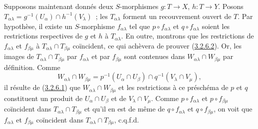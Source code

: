 Supposons maintenant donnés deux $S$-morphismes $g:T\to X$, $h:T\to Y$.
Posons
$T_{\alpha\lambda}=g^{-1}(U_\alpha)\cap h^{-1}(V_\lambda)$~; les
$T_{\alpha\lambda}$ forment un recouvrement ouvert de $T$. Par hypothèse,
il existe un $S$-morphisme $f_{\alpha\lambda}$ tel que
$p\circ f_{\alpha\lambda}$ et $q\circ f_{\alpha\lambda}$ soient les
restrictions respectives de $g$ et $h$ à $T_{\alpha\lambda}$. En outre,
montrons que les restrictions de $f_{\alpha\lambda}$ et
$f_{\beta\mu}$ à
$T_{\alpha\lambda}\cap T_{\beta\mu}$ coïncident, ce qui achèvera de
prouver (\hyperref[I.3.2.6.2-fr]{3.2.6.2}). Or, les images de
$T_{\alpha\lambda}\cap T_{\beta\mu}$ par $f_{\alpha\lambda}$ et par
$f_{\beta\mu}$ sont contenues dans
$W_{\alpha\lambda}\cap W_{\beta\mu}$ par définition. Comme
\[
  W_{\alpha\lambda}\cap W_{\beta\mu}
  =p^{-1}(U_\alpha\cap U_\beta)\cap
   q^{-1}(V_\lambda\cap V_\mu),
\]
il résulte de (\hyperref[I.3.2.6.1-fr]{3.2.6.1}) que
$W_{\alpha\lambda}\cap W_{\beta\mu}$ et les restrictions à ce préschéma
de $p$ et $q$ constituent un produit de
$U_\alpha\cap U_\beta$ et de $V_\lambda\cap V_\mu$. Comme
$p\circ f_{\alpha\lambda}$ et $p\circ f_{\beta\mu}$ coïncident dans
$T_{\alpha\lambda}\cap T_{\beta\mu}$ et qu'il en est de même de
$q\circ f_{\alpha\lambda}$ et $q\circ f_{\beta\mu}$, on voit que
$f_{\alpha\lambda}$ et $f_{\beta\mu}$ coïncident dans
$T_{\alpha\lambda}\cap T_{\beta\mu}$, c.q.f.d.

